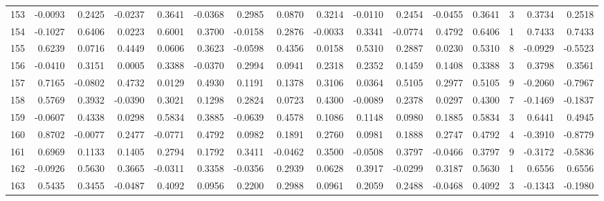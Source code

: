 \begin{tabular}{lrrrrrrrrrrrrrrr}
153 &     -0.0093 &  0.2425 & -0.0237 &  0.3641 & -0.0368 &  0.2985 &  0.0870 &  0.3214 & -0.0110 &  0.2454 &  -0.0455 &     0.3641 &      3 &                    0.3734 &                     0.2518 \\
154 &     -0.1027 &  0.6406 &  0.0223 &  0.6001 &  0.3700 & -0.0158 &  0.2876 & -0.0033 &  0.3341 & -0.0774 &   0.4792 &     0.6406 &      1 &                    0.7433 &                     0.7433 \\
155 &      0.6239 &  0.0716 &  0.4449 &  0.0606 &  0.3623 & -0.0598 &  0.4356 &  0.0158 &  0.5310 &  0.2887 &   0.0230 &     0.5310 &      8 &                   -0.0929 &                    -0.5523 \\
156 &     -0.0410 &  0.3151 &  0.0005 &  0.3388 & -0.0370 &  0.2994 &  0.0941 &  0.2318 &  0.2352 &  0.1459 &   0.1408 &     0.3388 &      3 &                    0.3798 &                     0.3561 \\
157 &      0.7165 & -0.0802 &  0.4732 &  0.0129 &  0.4930 &  0.1191 &  0.1378 &  0.3106 &  0.0364 &  0.5105 &   0.2977 &     0.5105 &      9 &                   -0.2060 &                    -0.7967 \\
158 &      0.5769 &  0.3932 & -0.0390 &  0.3021 &  0.1298 &  0.2824 &  0.0723 &  0.4300 & -0.0089 &  0.2378 &   0.0297 &     0.4300 &      7 &                   -0.1469 &                    -0.1837 \\
159 &     -0.0607 &  0.4338 &  0.0298 &  0.5834 &  0.3885 & -0.0639 &  0.4578 &  0.1086 &  0.1148 &  0.0980 &   0.1885 &     0.5834 &      3 &                    0.6441 &                     0.4945 \\
160 &      0.8702 & -0.0077 &  0.2477 & -0.0771 &  0.4792 &  0.0982 &  0.1891 &  0.2760 &  0.0981 &  0.1888 &   0.2747 &     0.4792 &      4 &                   -0.3910 &                    -0.8779 \\
161 &      0.6969 &  0.1133 &  0.1405 &  0.2794 &  0.1792 &  0.3411 & -0.0462 &  0.3500 & -0.0508 &  0.3797 &  -0.0466 &     0.3797 &      9 &                   -0.3172 &                    -0.5836 \\
162 &     -0.0926 &  0.5630 &  0.3665 & -0.0311 &  0.3358 & -0.0356 &  0.2939 &  0.0628 &  0.3917 & -0.0299 &   0.3187 &     0.5630 &      1 &                    0.6556 &                     0.6556 \\
163 &      0.5435 &  0.3455 & -0.0487 &  0.4092 &  0.0956 &  0.2200 &  0.2988 &  0.0961 &  0.2059 &  0.2488 &  -0.0468 &     0.4092 &      3 &                   -0.1343 &                    -0.1980 \\

\end{tabular}
